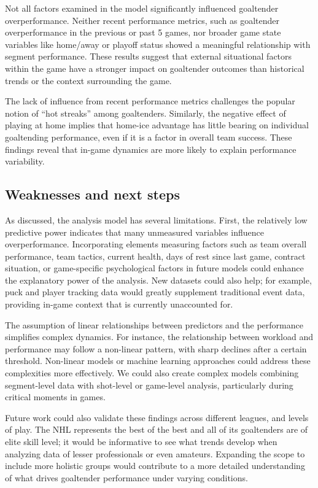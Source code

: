 \documentclass[
  letterpaper,
  DIV=11,
  numbers=noendperiod]{scrartcl}
\begin{document}
Not all factors examined in the model significantly influenced
goaltender overperformance. Neither recent performance metrics, such as
goaltender overperformance in the previous or past 5 games, nor broader
game state variables like home/away or playoff status showed a
meaningful relationship with segment performance. These results suggest
that external situational factors within the game have a stronger impact
on goaltender outcomes than historical trends or the context surrounding
the game.

The lack of influence from recent performance metrics challenges the
popular notion of ``hot streaks'' among goaltenders. Similarly, the
negative effect of playing at home implies that home-ice advantage has
little bearing on individual goaltending performance, even if it is a
factor in overall team success. These findings reveal that in-game
dynamics are more likely to explain performance variability.

\subsection{Weaknesses and next steps}\label{weaknesses-and-next-steps}

As discussed, the analysis model has several limitations. First, the
relatively low predictive power indicates that many unmeasured variables
influence overperformance. Incorporating elements measuring factors such
as team overall performance, team tactics, current health, days of rest
since last game, contract situation, or game-specific psychological
factors in future models could enhance the explanatory power of the
analysis. New datasets could also help; for example, puck and player
tracking data would greatly supplement traditional event data, providing
in-game context that is currently unaccounted for.

The assumption of linear relationships between predictors and the
performance simplifies complex dynamics. For instance, the relationship
between workload and performance may follow a non-linear pattern, with
sharp declines after a certain threshold. Non-linear models or machine
learning approaches could address these complexities more effectively.
We could also create complex models combining segment-level data with
shot-level or game-level analysis, particularly during critical moments
in games.

Future work could also validate these findings across different leagues,
and levels of play. The NHL represents the best of the best and all of
its goaltenders are of elite skill level; it would be informative to see
what trends develop when analyzing data of lesser professionals or even
amateurs. Expanding the scope to include more holistic groups would
contribute to a more detailed understanding of what drives goaltender
performance under varying conditions.
\end{document}
